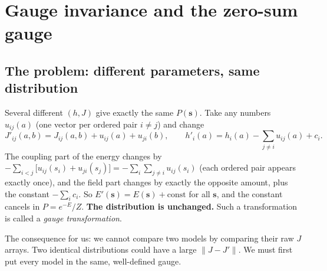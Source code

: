 \documentclass[11pt,a4paper]{article}
\newcommand{\s}{\bm{s}}
\begin{document}
\section{Gauge invariance and the zero-sum gauge}\label{sec:gauge}
\subsection{The problem: different parameters, same distribution}
Several different $(h,J)$ give exactly the same $P(\s)$. Take any numbers $u_{ij}(a)$ (one
vector per ordered pair $i\neq j$) and change
\begin{equation}\label{eq:gaugetr}
J'_{ij}(a,b) = J_{ij}(a,b) + u_{ij}(a) + u_{ji}(b),\qquad
h'_i(a) = h_i(a) - \sum_{j\neq i}u_{ij}(a) + c_i .
\end{equation}
The coupling part of the energy changes by
$-\sum_{i<j}\big[u_{ij}(s_i)+u_{ji}(s_j)\big] = -\sum_i\sum_{j\neq i}u_{ij}(s_i)$
(each ordered pair appears exactly once), and the field part changes by exactly the opposite
amount, plus the constant $-\sum_i c_i$. So $E'(\s)=E(\s)+\text{const}$ for all $\s$, and the constant
cancels in $P=e^{-E}/Z$. \textbf{The distribution is unchanged.} Such a transformation is called a
\emph{gauge transformation}.

The consequence for us: we cannot compare two models by comparing their raw $J$ arrays. Two
identical distributions could have a large $\|J-J'\|$. We must first put every model in the same,
well-defined gauge.
\end{document}
